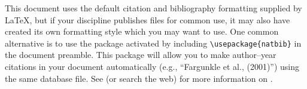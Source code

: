 This document uses the default citation and bibliography formatting
supplied by \LaTeX, but if your discipline publishes \BiBTeX{} files
for common use, it may also have created its own \BiBTeX{} formatting
style which you may want to use.  One common alternative is to use
the  package activated by
including \verb|\usepackage{natbib}| in the document preamble.  This
package will allow you to make author--year citations in your document
automatically (e.g., ``Fargunkle et al., (2001)'') using the
same \BiBTeX{} database file.  See \cite{Kopka:2004:GLT} (or search
the web) for more information on .
